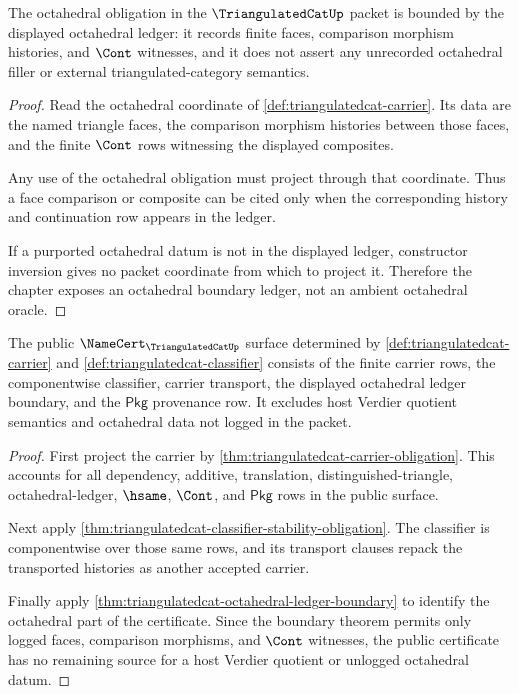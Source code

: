 \begin{theorem}
\label{thm:triangulatedcat-octahedral-ledger-boundary}
The octahedral obligation in the $\TriangulatedCatUp$ packet is bounded by the
displayed octahedral ledger: it records finite faces, comparison morphism
histories, and $\Cont$ witnesses, and it does not assert any unrecorded
octahedral filler or external triangulated-category semantics.
\end{theorem}
\begin{proof}
Read the octahedral coordinate of
\autoref{def:triangulatedcat-carrier}. Its data are the named triangle faces,
the comparison morphism histories between those faces, and the finite
$\Cont$ rows witnessing the displayed composites.

Any use of the octahedral obligation must project through that coordinate.
Thus a face comparison or composite can be cited only when the corresponding
history and continuation row appears in the ledger.

If a purported octahedral datum is not in the displayed ledger, constructor
inversion gives no packet coordinate from which to project it. Therefore the
chapter exposes an octahedral boundary ledger, not an ambient octahedral
oracle.
\end{proof}

\begin{theorem}
\label{thm:triangulatedcat-namecert-obligation-surface}
The public $\NameCert_{\TriangulatedCatUp}$ surface determined by
\autoref{def:triangulatedcat-carrier} and
\autoref{def:triangulatedcat-classifier} consists of the finite carrier rows,
the componentwise classifier, carrier transport, the displayed octahedral
ledger boundary, and the $\mathsf{Pkg}$ provenance row. It excludes host
Verdier quotient semantics and octahedral data not logged in the packet.
\end{theorem}
\begin{proof}
First project the carrier by
\autoref{thm:triangulatedcat-carrier-obligation}. This accounts for all
dependency, additive, translation, distinguished-triangle,
octahedral-ledger, $\hsame$, $\Cont$, and $\mathsf{Pkg}$ rows in the public
surface.

Next apply
\autoref{thm:triangulatedcat-classifier-stability-obligation}. The classifier
is componentwise over those same rows, and its transport clauses repack the
transported histories as another accepted carrier.

Finally apply
\autoref{thm:triangulatedcat-octahedral-ledger-boundary} to identify the
octahedral part of the certificate. Since the boundary theorem permits only
logged faces, comparison morphisms, and $\Cont$ witnesses, the public
certificate has no remaining source for a host Verdier quotient or unlogged
octahedral datum.
\end{proof}

